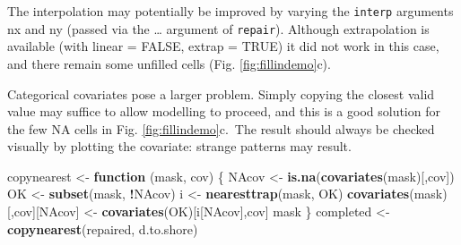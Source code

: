 \documentclass[
]{book}
\newenvironment{Shaded}{\begin{snugshade}}{\end{snugshade}}
\newcommand{\AttributeTok}[1]{\textcolor[rgb]{0.13,0.29,0.53}{#1}}
\newcommand{\ConstantTok}[1]{\textcolor[rgb]{0.56,0.35,0.01}{#1}}
\newcommand{\ControlFlowTok}[1]{\textcolor[rgb]{0.13,0.29,0.53}{\textbf{#1}}}
\newcommand{\DecValTok}[1]{\textcolor[rgb]{0.00,0.00,0.81}{#1}}
\newcommand{\FunctionTok}[1]{\textcolor[rgb]{0.13,0.29,0.53}{\textbf{#1}}}
\newcommand{\NormalTok}[1]{#1}
\newcommand{\OtherTok}[1]{\textcolor[rgb]{0.56,0.35,0.01}{#1}}
\newcommand{\SpecialCharTok}[1]{\textcolor[rgb]{0.81,0.36,0.00}{\textbf{#1}}}
\newcommand{\StringTok}[1]{\textcolor[rgb]{0.31,0.60,0.02}{#1}}
\begin{document}
\begin{Shaded}
\end{Shaded}

The interpolation may potentially be improved by varying the \texttt{interp} arguments nx and ny (passed via the \ldots{} argument of \texttt{repair}). Although extrapolation is available (with linear = FALSE, extrap = TRUE) it did not work in this case, and there remain some unfilled cells (Fig. \ref{fig:fillindemo}c).

Categorical covariates pose a larger problem. Simply copying the closest valid value may suffice to allow modelling to proceed, and this is a good solution for the few NA cells in Fig. \ref{fig:fillindemo}c.~The result should always be checked visually by plotting the covariate: strange patterns may result.

\begin{Shaded}
\begin{Highlighting}[]
\NormalTok{copynearest }\OtherTok{\textless{}{-}} \ControlFlowTok{function}\NormalTok{ (mask, cov) \{}
\NormalTok{    NAcov }\OtherTok{\textless{}{-}} \FunctionTok{is.na}\NormalTok{(}\FunctionTok{covariates}\NormalTok{(mask)[,cov])}
\NormalTok{    OK }\OtherTok{\textless{}{-}} \FunctionTok{subset}\NormalTok{(mask, }\SpecialCharTok{!}\NormalTok{NAcov)}
\NormalTok{    i }\OtherTok{\textless{}{-}} \FunctionTok{nearesttrap}\NormalTok{(mask, OK)}
    \FunctionTok{covariates}\NormalTok{(mask)[,cov][NAcov] }\OtherTok{\textless{}{-}} \FunctionTok{covariates}\NormalTok{(OK)[i[NAcov],cov]}
\NormalTok{    mask}
\NormalTok{\}}
\NormalTok{completed }\OtherTok{\textless{}{-}} \FunctionTok{copynearest}\NormalTok{(repaired, }\StringTok{\textquotesingle{}d.to.shore\textquotesingle{}}\NormalTok{)}
\end{Highlighting}
\end{Shaded}
\end{document}
